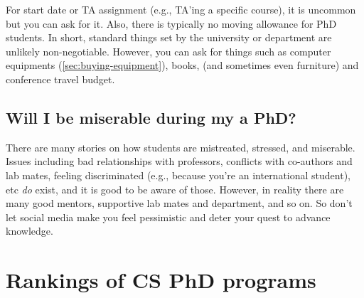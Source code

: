 \documentclass[oneside,11pt]{book}
\begin{document}
For start date or TA assignment (e.g., TA'ing a specific course), it is uncommon but you can ask for it. Also, there is typically no moving allowance for PhD students. In short, standard things set by the university or department are unlikely non-negotiable.  However, you can ask for things such as computer equipments (\autoref{sec:buying-equipment}), books, (and sometimes even furniture) and conference travel budget.


\section{Will I be miserable during my a PhD?}\label{sec:happy}
There are many stories on how students are mistreated, stressed, and miserable. Issues including bad relationships with professors, conflicts with co-authors and lab mates, feeling discriminated (e.g., because you're an international student), etc \emph{do} exist, and it is good to be aware of those.  However, in reality there are many good mentors, supportive lab mates and department, and so on.  So don't let social media make you feel pessimistic and deter your quest to advance knowledge.

\appendix

\chapter{Rankings of CS PhD programs}\label{sec:ranking}
\end{document}
